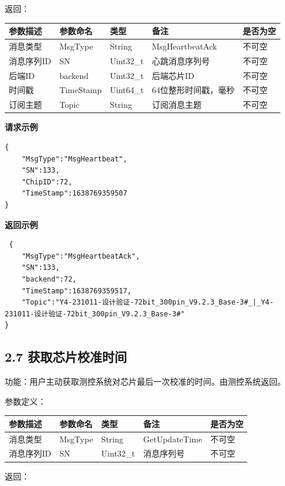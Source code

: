 \documentclass{ctexart}
\begin{document}
返回：

\begin{longtable}{|l|l|l|l|l|}
\hline
\textbf{\textbf{参数描述}} & \textbf{\textbf{参数命名}} & \textbf{\textbf{类型}} & \textbf{\textbf{备注}} & \textbf{\textbf{是否为空}} \\
\hline
消息类型 & MsgType & String & MsgHeartbeatAck & 不可空 \\
消息序列ID & SN & Uint32_t & 心跳消息序列号 & 不可空 \\
后端ID & backend & Uint32_t & 后端芯片ID & 不可空 \\
时间戳 & TimeStamp & Uint64_t & 64位整形时间戳，毫秒 & 不可空 \\
订阅主题 & Topic & String & 订阅消息主题 & 不可空 \\
\hline
\end{longtable}

\textbf{请求示例}

\begin{verbatim}{
    "MsgType":"MsgHeartbeat",
    "SN":133,
    "ChipID":72,
    "TimeStamp":1638769359507
}\end{verbatim}

\textbf{返回示例}

\begin{verbatim} {
    "MsgType":"MsgHeartbeatAck",
    "SN":133,
    "backend":72,
    "TimeStamp":1638769359517,
    "Topic":"Y4-231011-设计验证-72bit_300pin_V9.2.3_Base-3#_|_Y4-231011-设计验证-72bit_300pin_V9.2.3_Base-3#"
}\end{verbatim}

\subsection{2.7 获取芯片校准时间}

功能：用户主动获取测控系统对芯片最后一次校准的时间。由测控系统返回。

参数定义：

\begin{longtable}{|l|l|l|l|l|}
\hline
\textbf{\textbf{参数描述}} & \textbf{\textbf{参数命名}} & \textbf{\textbf{类型}} & \textbf{\textbf{备注}} & \textbf{\textbf{是否为空}} \\
\hline
消息类型 & MsgType & String & GetUpdateTime & 不可空 \\
消息序列ID & SN & Uint32_t & 消息序列号 & 不可空 \\
\hline
\end{longtable}

返回：
\end{document}
